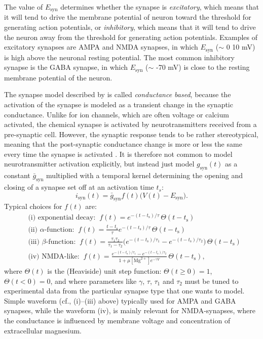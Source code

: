 The value of $E_\text{syn}$ determines whether the synapse is \textit{excitatory}, which means that it will tend to drive the  membrane potential of neuron toward the threshold for generating action potentials, or \textit{inhibitory}, which means that it will tend to drive the neuron away from the threshold for generating action potentials. Examples of excitatory synapses are AMPA and NMDA synapses, in which $E_\text{syn}$ ($\sim$ 0 \gex{--} 10 mV) is high above the neuronal resting potential. The most common inhibitory synapse is the GABA synapse, in which $E_\text{syn}$ ($\sim$ -70 mV) is close to the resting membrane potential of the neuron.

The synapse model described by  is called \textit{conductance based}, because the activation of the synapse is modeled as a transient change in the synaptic conductance. Unlike for ion channels, which are often voltage or calcium activated, the chemical synapse is activated by neurotransmitters received from a pre-synaptic cell. However, the synaptic response tends to be rather stereotypical, meaning that the post-synaptic conductance change is more or less the same every time the synapse is activated . 
It is therefore not common to model neurotransmitter activation explicitly, but instead just
model $g_\text{syn}(t)$ as a constant $\bar{g}_\text{syn}$ multiplied with a temporal kernel determining the opening and closing of a synapse set off at an activation time $t_s$:
\begin{equation}
i_\text{syn}(t) = \bar{g}_\text{syn} f(t) \big(V(t)-E_\text{syn} \big).
\label{eq:Neuron:chemicalsynapse}
\end{equation}
Typical choices for $f(t)$ are: 
\begin{align}
&\text{(i) exponential decay:} \;\; f(t) = e^{-(t-t_\text{s})/\tau}\, \Theta(t-t_\text{s}) \\
&\text{(ii) $\alpha$-function:} \;\; f(t) =  \frac{t-t_\text{s}}{\tau} e^{-(t-t_\text{s})/\tau} \, \Theta(t-t_\text{s}) \\
&\text{(iii) $\beta$-function:} \;\; f(t) = \frac{\tau_1 \tau_2}{\tau_1-\tau_2} 
\Big( e^{-(t-t_\text{s})/\tau_1} - e^{-(t-t_\text{s})/\tau_2} \Big) \, \Theta(t-t_\text{s}) \\
& \text{(iv) NMDA-like:} \;\; f(t) = \frac{e^{-(t-t_\text{s})/\tau_1} - e^{-(t-t_\text{s})/\tau_2}} {1+\mu [\text{Mg}^{2+}] e^{-\gamma V} } \, \Theta(t-t_\text{s}),
\label{eq:Neuron:sf4}
\end{align}
where $\Theta(t)$ is the (Heaviside) unit step function: $\Theta(t \ge 0)=1$,  $\Theta(t< 0)=0$, and where parameters like $\gamma$,  $\tau$, $\tau_1$ and $\tau_2$ must be tuned to experimental data from the particular synapse type that one wants to model. Simple waveform (cf., (i)--(iii) above) typically used for AMPA  and GABA synapses, while the waveform (iv), is mainly relevant for NMDA-synapses, where the conductance is influenced by membrane voltage and concentration of extracellular magnesium. 

